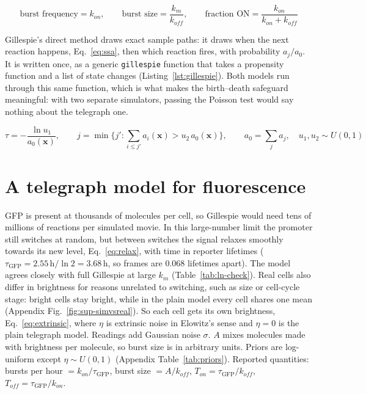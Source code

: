 \begin{equation}
\text{burst frequency} = k_{on}, \qquad \text{burst size} = \frac{k_m}{k_{off}}, \qquad \text{fraction ON} = \frac{k_{on}}{k_{on}+k_{off}}
\label{eq:burst}
\end{equation}

Gillespie's direct method \cite{gillespie1977} draws exact sample paths: it draws when the next reaction happens, Eq.~\eqref{eq:ssa}, then which reaction fires, with probability $a_j/a_0$. It is written once, as a generic \texttt{gillespie} function that takes a propensity function and a list of state changes (Listing~\ref{lst:gillespie}). Both models run through this same function, which is what makes the birth--death safeguard meaningful: with two separate simulators, passing the Poisson test would say nothing about the telegraph one.

\begin{equation}
\tau = -\frac{\ln u_1}{a_0(\mathbf{x})}, \qquad
j = \min\Big\{ j' : \sum_{i \le j'} a_i(\mathbf{x}) > u_2\, a_0(\mathbf{x}) \Big\}, \qquad a_0 = \sum_j a_j,\quad u_1,u_2 \sim U(0,1)
\label{eq:ssa}
\end{equation}

\section{A telegraph model for fluorescence}\label{sec:fluor-model}

GFP is present at thousands of molecules per cell, so Gillespie would need tens of millions of reactions per simulated movie. In this large-number limit the promoter still switches at random, but between switches the signal relaxes smoothly towards its new level, Eq.~\eqref{eq:relax}, with time in reporter lifetimes ($\tau_{\mathrm{GFP}} = 2.55\,\mathrm{h}/\ln 2 = 3.68$\,h, so frames are 0.068 lifetimes apart). The model agrees closely with full Gillespie at large $k_m$ (Table~\ref{tab:ln-check}). Real cells also differ in brightness for reasons unrelated to switching, such as size or cell-cycle stage: bright cells stay bright, while in the plain model every cell shares one mean (Appendix Fig.~\ref{fig:sup-simvsreal}). So each cell gets its own brightness, Eq.~\eqref{eq:extrinsic}, where $\eta$ is extrinsic noise in Elowitz's sense \cite{elowitz2002} and $\eta = 0$ is the plain telegraph model. Readings add Gaussian noise $\sigma$. $A$ mixes molecules made with brightness per molecule, so burst size is in arbitrary units. Priors are log-uniform except $\eta \sim U(0,1)$ (Appendix Table~\ref{tab:priors}). Reported quantities: bursts per hour $= k_{on}/\tau_{\mathrm{GFP}}$, burst size $= A/k_{off}$, $T_{on} = \tau_{\mathrm{GFP}}/k_{off}$, $T_{off} = \tau_{\mathrm{GFP}}/k_{on}$.

